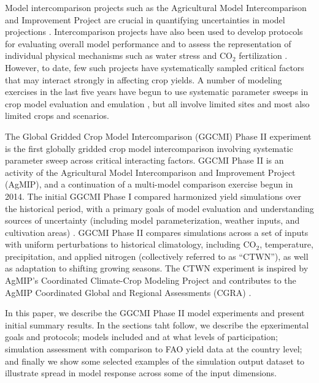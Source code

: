\documentclass[gmd, manuscript]{copernicus} %
\begin{document}
Model intercomparison projects such as the Agricultural Model Intercomparison and Improvement Project \citep[AgMIP, ][]{ROSENZWEIG2013} are crucial in quantifying uncertainties in model projections \citep{Rosenzweig2014}. Intercomparison projects have also been used to develop protocols for evaluating overall model performance \citep{Elliott2015, muller_global_2017} and to assess the representation of individual physical mechanisms such as water stress and CO$_2$ fertilization \citep[e.g.][]{Schauberger2017}.
However, to date, few such projects have systematically sampled critical factors that may interact strongly in affecting crop yields. A number of modeling exercises in the last five years have begun to use
systematic parameter sweeps in crop model evaluation and emulation  \citep[e.g.][]{ruane2014, Markowski2015, Pirttioja2015,FRONZEK20182, Snyder2018, RUIZRAMOS2018}, but all involve limited sites and most also limited crops and scenarios. 

The Global Gridded Crop Model Intercomparison (GGCMI) Phase II experiment is the first globally gridded crop model intercomparison involving systematic parameter sweep across critical interacting factors.
GGCMI Phase II is an activity of the Agricultural Model Intercomparison and Improvement Project (AgMIP), 
and a continuation of a multi-model comparison exercise begun in 2014. 
The initial GGCMI Phase I compared harmonized yield simulations over the historical period, with a primary goals of model evaluation and understanding sources of uncertainty (including model parameterization, weather inputs, and cultivation areas) \citep{Elliott2015, muller_global_2017, folberth2016, porwollik_spatial_2016}. 
GGCMI Phase II compares simulations across a set of inputs with uniform perturbations to historical climatology,  
including CO$_2$, temperature, precipitation, and applied nitrogen (collectively referred to as ``CTWN''), as well as adaptation to shifting growing seasons. 
The CTWN experiment is inspired by AgMIP's Coordinated Climate-Crop Modeling Project \citep[C3MP][]{ruane2014,mcdermid2015agmip} and contributes to the AgMIP Coordinated Global and Regional Assessments (CGRA) \citep{ruane2018, rosenzweig2018}. 

In this paper, we describe the GGCMI Phase II model experiments and present initial summary results.
In the sections taht follow, we describe the epxerimental goals and protocols; 
models included and at what levels of participation;
simulation assessment with comparison to FAO yield data at the country level; and 
finally we show some selected examples of the simulation output dataset to illustrate spread in model response across some of the input dimensions.
\end{document}
